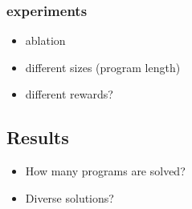 \subsubsection{experiments}
\begin{itemize}
    \item ablation
    \item different sizes (program length)
    \item different rewards?
\end{itemize}





















\subsection{Results}
\begin{itemize}
    \item How many programs are solved?
    \item Diverse solutions?
\end{itemize}
























